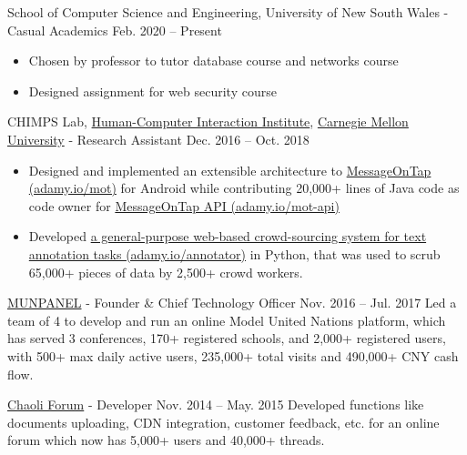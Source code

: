\documentclass[hidelinks__VERSION__]{adamyi-cv}
\begin{document}
\begin{entrylist}


\entry
{School of Computer Science and Engineering, University of New South Wales - Casual Academics}
{Feb. 2020 -- Present}
{
\begin{minipage}[t]{1\linewidth}
\begin{itemize}[leftmargin=*,align=left,noitemsep]
\item Chosen by professor to tutor database course and networks course
\item Designed assignment for web security course
\end{itemize}
\end{minipage}
}


\entry
{CHIMPS Lab, \href{https://www.hcii.cmu.edu/}{Human-Computer Interaction Institute}, \href{https://www.cmu.edu/}{Carnegie Mellon University} - Research Assistant}
{Dec. 2016 -- Oct. 2018}
{
\begin{minipage}[t]{1\linewidth}
\begin{itemize}[leftmargin=*,align=left,noitemsep]
\item Designed and implemented an extensible architecture to \href{https://adamy.io/mot}{MessageOnTap (adamy.io/mot)} for Android while contributing 20,000+ lines of Java code as code owner for \href{https://adamy.io/mot-api}{MessageOnTap API (adamy.io/mot-api)}
\item Developed \href{https://adamy.io/annotator}{a general-purpose web-based crowd-sourcing system for text annotation tasks (adamy.io/annotator)} in Python, that was used to scrub 65,000+ pieces of data by 2,500+ crowd workers.
\end{itemize}
\end{minipage}
}


\entry
{\href{https://www.munpanel.com}{MUNPANEL} - Founder \& Chief Technology Officer}
{Nov. 2016 -- Jul. 2017}
{Led a team of 4 to develop and run an online Model United Nations platform, which has served 3 conferences, 170+ registered schools, and 2,000+ registered users, with 500+ max daily active users, 235,000+ total visits and 490,000+ CNY cash flow.}


\entry
{\href{https://chaoli.club}{Chaoli Forum} - Developer}
{Nov. 2014 -- May. 2015}
{Developed functions like documents uploading, CDN integration, customer feedback, etc. for an online forum which now has 5,000+ users and 40,000+ threads.}

\end{entrylist}
\end{document}

